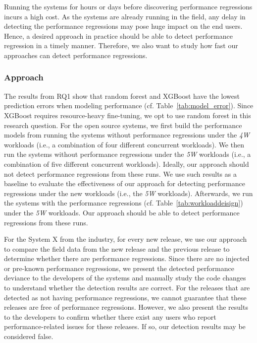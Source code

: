 Running the systems for hours or days before discovering performance regressions incurs a high cost. As the systems are already running in the field, any delay in detecting the performance regressions may pose huge impact on the end users. Hence, a desired approach in practice should be able to detect performance regression in a timely manner. Therefore, we also want to study how fast our approaches can detect performance regressions. 

\subsubsection*{Approach}

The results from RQ1 show that random forest and XGBoost have the lowest prediction errors when modeling performance (cf. Table~\ref{tab:model_error}). Since XGBoost requires resource-heavy fine-tuning, we opt to use random forest in this research question. For the open source systems, we first build the performance models from running the systems without performance regressions under the \emph{4W} workloads (i.e., a combination of four different concurrent workloads). We then run the systems without performance regressions under the \emph{5W} workloads (i.e., a combination of five different concurrent workloads). Ideally, our approach should not detect performance regressions from these runs. 
We use such results as a baseline to evaluate the effectiveness of our approach for detecting performance regressions under the new workloads (i.e., the \emph{5W} workloads). 
Afterwards, we run the systems with the performance regressions (cf. Table~\ref{tab:workloaddeisign}) under the \emph{5W} workloads. Our approach should be able to detect performance regressions from these runs.

For the System X from the industry, for every new release, we use our approach to compare the field data from the new release and the previous release to determine whether there are performance regressions. Since there are no injected or pre-known performance regressions, we present the detected performance deviance to the developers of the systems and manually study the code changes to understand whether the detection results are correct. For the releases that are detected as not having performance regressions, we cannot guarantee that these releases are free of performance regressions. However, we also present the results to the developers to confirm whether there exist any users who report performance-related issues for these releases. If so, our detection results may be considered false.

